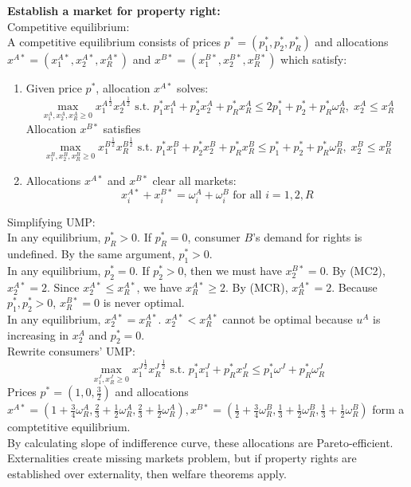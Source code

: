 \documentclass[12pt]{article}
\newcommand{\opxoa}{x^{A\ast}_1}
\newcommand{\opxta}{x^{A\ast}_2}
\newcommand{\opxra}{x^{A\ast}_R}
\newcommand{\opxob}{x^{B\ast}_1}
\newcommand{\opxtb}{x^{B\ast}_2}
\newcommand{\opxrb}{x^{B\ast}_R}
\newcommand{\opxa}{x^{A\ast}}
\newcommand{\opxb}{x^{B\ast}}
\newcommand{\opp}{p^{\ast}}
\newcommand{\oppo}{p^{\ast}_1}
\newcommand{\oppt}{p^{\ast}_2}
\newcommand{\oppr}{p^{\ast}_R}
\begin{document}
\noindent
\textbf{Establish a market for property right:}\\
Competitive equilibrium:\\
A competitive equilibrium consists of prices $\opp = (\oppo, \oppt, \oppr)$ and allocations $\opxa = (\opxoa, \opxta, \opxra)$ and $\opxb = (\opxob, \opxtb, \opxrb)$ which satisfy:
\begin{enumerate}
	\item Given price $\opp$, allocation $\opxa$ solves:
		\[ \max_{x^A_1, x^A_2, x^A_R \geq 0} {x^A_1}^{\frac{1}{2}}{x^A_2}^{\frac{1}{2}} \text{ s.t. } \oppo x^A_1 + \oppt x^{A}_2 + \oppr x^A_R \leq 2\oppo + \oppt + \oppr\omega^A_R, \; x^A_2 \leq x^A_R
	\]
	Allocation $\opxb$ satisfies
	\[ \max_{x^B_1, x^B_2, x^B_R \geq 0} {x^B_1}^{\frac{1}{2}}{x^B_R}^{\frac{1}{2}} \text{ s.t. } \oppo x^B_1 + \oppt x^{B}_2 + \oppr x^B_R \leq \oppo + \oppt + \oppr\omega^B_R, \; x^B_2 \leq x^B_R
	\]
	\item Allocations $\opxa$ and $\opxb$ clear all markets:
	\[ x^{A\ast}_i + x^{B\ast}_i = \omega^A_i + \omega^B_i \text{ for all } i = 1, 2, R
	\]
\end{enumerate}
Simplifying UMP:\\
In any equilibrium, $\oppr >0$. If $\oppr = 0$, consumer $B$'s demand for rights is undefined. By the same argument, $\oppo>0$. \\
In any equilibrium, $\oppt = 0$. If $\oppt > 0$, then we must have $\opxtb = 0$. By (MC2), $\opxta = 2$. Since $\opxta \leq \opxra$, we have $\opxra \geq 2$. By (MCR), $\opxra = 2$. Because $\oppo, \oppt > 0$, $\opxrb = 0$ is never optimal.\\

\noindent
In any equilibrium, $\opxta = \opxra$. $\opxta < \opxra $ cannot be optimal because $u^A$ is increasing in $x^A_2$ and $\oppt = 0$. \\
Rewrite consumers' UMP:\\
\[ \max_{x^J_1, x^J_R \geq 0} {x^J_1}^{\frac{1}{2}}{x^J_R}^{\frac{1}{2}} \text{ s.t. } \oppo x^J_1+ \oppr x^J_R \leq \oppo\omega^J + \oppr\omega^J_R
\]
Prices $\opp = (1, 0, \frac{3}{2})$ and allocations $\opxa = (1+\frac{3}{4}\omega^A_R, \frac{2}{3}+\frac{1}{2}\omega^A_R, \frac{2}{3}+\frac{1}{2}\omega^A_R), \opxb=(\frac{1}{2}+\frac{3}{4}\omega^B_R, \frac{1}{3}+\frac{1}{2}\omega^B_R, \frac{1}{3}+\frac{1}{2}\omega^B_R)$ form a comptetitive equilibrium.\\

\noindent
By calculating slope of indifference curve, these allocations are Pareto-efficient.\\
Externalities create missing markets problem, but if property rights are established over externality, then welfare theorems apply.\\
\end{document}
